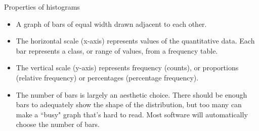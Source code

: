\documentclass[xcolor=table, aspectratio=169, bigger]{beamer}
\begin{document}
\begin{frame}{Properties of histograms}
\begin{block}{}
\begin{itemize}
\item A graph of bars of equal width drawn adjacent to each other.
\pause
\item The horizontal scale (x-axis) represents values of the quantitative data. Each bar represents a class, or range of values, from a frequency table. 
\pause
\item The vertical scale (y-axis) represents frequency (counts), or proportions (relative frequency) or percentages (percentage frequency).
\pause
\item The number of bars is largely an aesthetic choice. There should be enough bars to adequately show the shape of the distribution, but too many can make a ``busy" graph that's hard to read. Most software will automatically choose the number of bars.
\end{itemize}
\end{block}
\end{frame}
\end{document}
